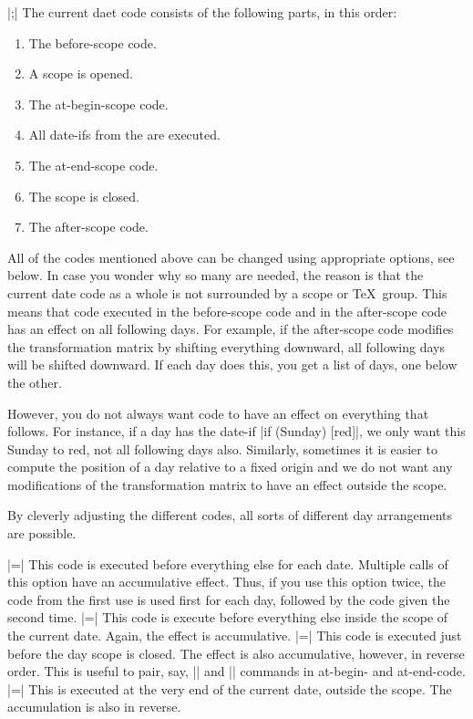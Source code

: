\begin{command}{\calendar {}|;|}
  The current daet code consists of the following parts, in this order:
  \begin{enumerate}
  \item The before-scope code.
  \item A scope is opened.
  \item The at-begin-scope code.
  \item All date-ifs from the  are
    executed.
  \item The at-end-scope code.
  \item The scope is closed.
  \item The after-scope code.
  \end{enumerate}
  All of the codes mentioned above can be changed using appropriate
  options, see below. In case you wonder why so many are needed, the
  reason is that the current date code as a whole is not
  surrounded by a scope or \TeX\ group. This means that code executed
  in the before-scope code and in the after-scope code has an effect
  on all following days. For example, if the after-scope code modifies
  the transformation matrix by shifting everything downward, all
  following days will be shifted downward. If each day does this, you
  get a list of days, one below the other.

  However, you do not always want code to have an effect on everything
  that follows. For instance, if a day has the date-if
  |if (Sunday) [red]|, we only want this Sunday to red, not all
  following days also. Similarly, sometimes it is easier to compute
  the position of a day relative to a fixed origin and we do not want
  any modifications of the transformation matrix to have an effect
  outside the scope.

  By cleverly adjusting the different codes, all sorts of different
  day arrangements are possible.

  \begin{itemize}
    |=| This
    code is executed before everything else for each date. Multiple
    calls of this option have an accumulative effect. Thus, if you use
    this option twice, the code from the first use is used first for
    each day, followed by the code given the second time.
    |=|
    This code is execute before everything else inside the scope of
    the current date. Again, the effect is accumulative.
    |=|
    This code is executed just before the day scope is
    closed. The effect is also accumulative, however, in reverse
    order. This is useful to pair, say, |\scope| and |\endscope|
    commands in at-begin- and at-end-code.
    |=| This
    is executed at the very end of the current date, outside the
    scope. The accumulation is also in reverse.
  \end{itemize}
\end{command}


